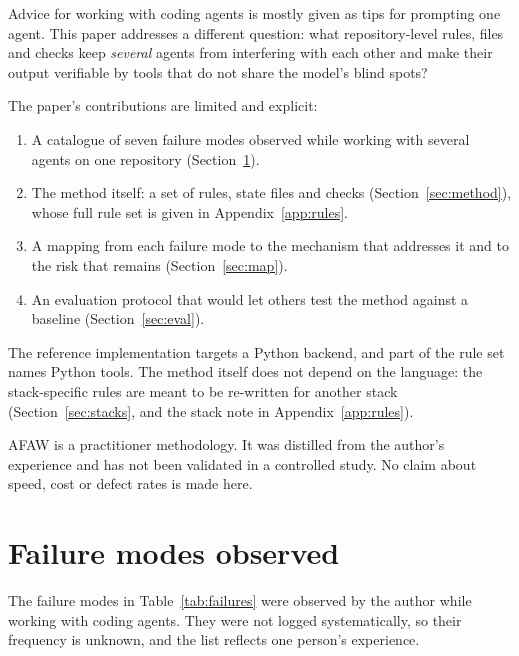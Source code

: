 \documentclass[11pt,a4paper]{article}
\begin{document}
Advice for working with coding agents is mostly given as tips for prompting one agent. This paper addresses a different question: what repository-level rules, files and checks keep \emph{several} agents from interfering with each other and make their output verifiable by tools that do not share the model's blind spots?

The paper's contributions are limited and explicit:
\begin{enumerate}
  \item A catalogue of seven failure modes observed while working with several agents on one repository (Section~\ref{sec:failures}).
  \item The method itself: a set of rules, state files and checks (Section~\ref{sec:method}), whose full rule set is given in Appendix~\ref{app:rules}.
  \item A mapping from each failure mode to the mechanism that addresses it and to the risk that remains (Section~\ref{sec:map}).
  \item An evaluation protocol that would let others test the method against a baseline (Section~\ref{sec:eval}).
\end{enumerate}

The reference implementation targets a Python backend, and part of the rule set names Python tools. The method itself does not depend on the language: the stack-specific rules are meant to be re-written for another stack (Section~\ref{sec:stacks}, and the stack note in Appendix~\ref{app:rules}).

AFAW is a practitioner methodology. It was distilled from the author's experience and has not been validated in a controlled study. No claim about speed, cost or defect rates is made here.

\section{Failure modes observed}
\label{sec:failures}

The failure modes in Table~\ref{tab:failures} were observed by the author while working with coding agents. They were not logged systematically, so their frequency is unknown, and the list reflects one person's experience.
\end{document}
